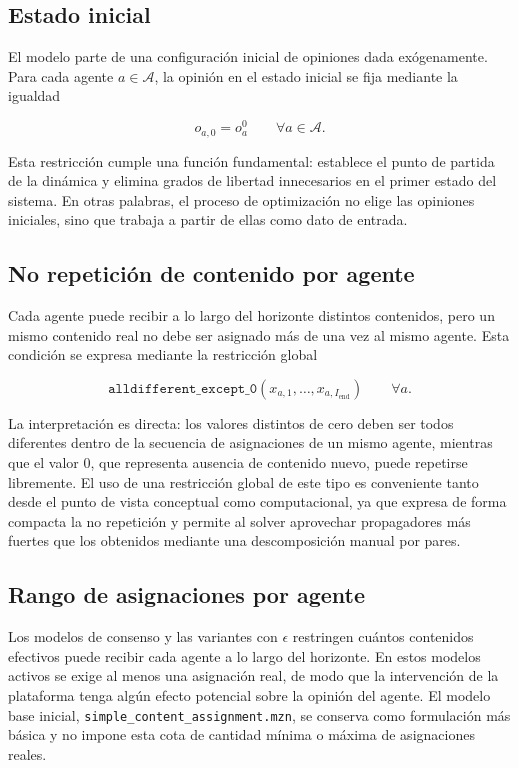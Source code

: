 \documentclass[10pt,letterpaper]{article}
\begin{document}
\subsection{Estado inicial}

El modelo parte de una configuraci\'on inicial de opiniones dada ex\'ogenamente. Para cada agente \(a \in \mathcal{A}\), la opini\'on en el estado inicial se fija mediante la igualdad

\[
o_{a,0}=o^0_a \qquad \forall a\in\mathcal{A}.
\]

Esta restricci\'on cumple una funci\'on fundamental: establece el punto de partida de la din\'amica y elimina grados de libertad innecesarios en el primer estado del sistema. En otras palabras, el proceso de optimizaci\'on no elige las opiniones iniciales, sino que trabaja a partir de ellas como dato de entrada.

\subsection{No repetici\'on de contenido por agente}

Cada agente puede recibir a lo largo del horizonte distintos contenidos, pero un mismo contenido real no debe ser asignado m\'as de una vez al mismo agente. Esta condici\'on se expresa mediante la restricci\'on global

\[
\texttt{alldifferent\_except\_0}(x_{a,1},\ldots,x_{a,I_{\text{end}}}) \qquad \forall a.
\]

La interpretaci\'on es directa: los valores distintos de cero deben ser todos diferentes dentro de la secuencia de asignaciones de un mismo agente, mientras que el valor \(0\), que representa ausencia de contenido nuevo, puede repetirse libremente. El uso de una restricci\'on global de este tipo es conveniente tanto desde el punto de vista conceptual como computacional, ya que expresa de forma compacta la no repetici\'on y permite al solver aprovechar propagadores m\'as fuertes que los obtenidos mediante una descomposici\'on manual por pares.

\subsection{Rango de asignaciones por agente}

Los modelos de consenso y las variantes con \(\epsilon\) restringen cu\'antos contenidos efectivos puede recibir cada agente a lo largo del horizonte. En estos modelos activos se exige al menos una asignaci\'on real, de modo que la intervenci\'on de la plataforma tenga alg\'un efecto potencial sobre la opini\'on del agente. El modelo base inicial, \texttt{simple\_content\_assignment.mzn}, se conserva como formulaci\'on m\'as b\'asica y no impone esta cota de cantidad m\'inima o m\'axima de asignaciones reales.
\end{document}
